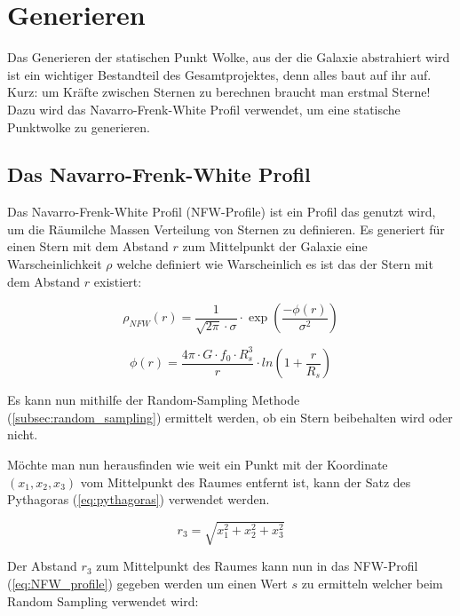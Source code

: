 \section{Generieren}

Das Generieren der statischen Punkt Wolke, aus der die Galaxie abstrahiert wird
ist ein wichtiger Bestandteil des Gesamtprojektes, denn alles baut auf ihr auf.
Kurz: um Kräfte zwischen Sternen zu berechnen braucht man erstmal Sterne! Dazu
wird das Navarro-Frenk-White Profil verwendet, um eine statische Punktwolke zu
generieren.

\subsection{Das Navarro-Frenk-White Profil}
Das Navarro-Frenk-White Profil (NFW-Profile) \cite{navarrofrenkwhite95} ist ein Profil das genutzt wird, um
die Räumilche Massen Verteilung von Sternen zu definieren. Es generiert für
einen Stern mit dem Abstand \( r \) zum Mittelpunkt der Galaxie eine
Warscheinlichkeit \( \rho \) welche definiert wie Warscheinlich es ist das der
Stern mit dem Abstand \( r \) existiert:

\begin{equation} \label{eq:NFW_profile}
  \rho_{NFW}(r) = \frac{ 1 }{ \sqrt{ 2 \pi } \cdot \sigma } \cdot
  \exp \left( \frac{ -\phi(r) }{ \sigma^{ 2 } } \right)
\end{equation}

\begin{equation*}
  \phi(r) = \frac{ 4\pi \cdot G \cdot f_{0} \cdot R_{s}^3 }{ r } \cdot
  ln{ \left( 1 + \frac{ r }{ R_{s} } \right) }
\end{equation*}

Es kann nun mithilfe der Random-Sampling Methode (\ref{subsec:random_sampling})
ermittelt werden, ob ein Stern beibehalten wird oder nicht.\\

\par Möchte man nun herausfinden wie weit ein Punkt mit der Koordinate \(
(x_{1}, x_{2}, x_{3}) \) vom Mittelpunkt des Raumes entfernt ist, kann der Satz
des Pythagoras (\ref{eq:pythagoras}) verwendet werden.

\begin{equation} \label{eq:pythagoras}
    r_{3} = \sqrt{x_{1}^{2} + x_{2}^{2} + x_{3}^{2} }
\end{equation}

Der Abstand \( r_{3} \) zum Mittelpunkt des Raumes kann nun in das NFW-Profil
(\ref{eq:NFW_profile}) gegeben werden um einen Wert \( s \) zu ermitteln welcher
beim Random Sampling verwendet wird:


